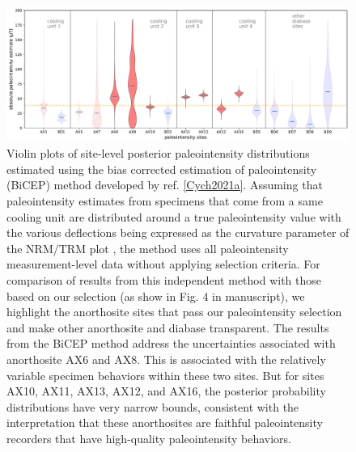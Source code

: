 \documentclass[9pt,twoside,lineno]{pnas-new}
\begin{document}
\begin{figure}[h!]
\noindent\includegraphics[width=17.8 cm]{manuscript/PINT_BiCEP.pdf}
\centering
\caption{{Violin plots of site-level posterior paleointensity distributions estimated using the bias corrected estimation of paleointensity (BiCEP) method developed by ref. \ref{Cych2021a}. Assuming that paleointensity estimates from specimens that come from a same cooling unit are distributed around a true paleointensity value with the various deflections being expressed as the curvature parameter of the NRM/TRM plot \cite{Arai1963a, Paterson2011a}, the method uses all paleointensity measurement-level data without applying selection criteria. For comparison of results from this independent method with those based on our selection (as show in Fig. 4 in manuscript), we highlight the anorthosite sites that pass our paleointensity selection and make other anorthosite and diabase transparent. The results from the BiCEP method address the uncertainties associated with anorthosite AX6 and AX8. This is associated with the relatively variable specimen behaviors within these two sites. But for sites AX10, AX11, AX13, AX12, and AX16, the posterior probability distributions have very narrow bounds, consistent with the interpretation that these anorthosites are faithful paleointensity recorders that have high-quality paleointensity behaviors. }}
\label{fig:PINT_BiCEP}
\end{figure}

\clearpage
\end{document}
